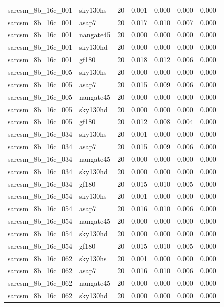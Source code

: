 \begin{tabular}{llrrrrr}
sarcsm\_8b\_16c\_001 & sky130hs & 20 & 0.001 & 0.000 & 0.000 & 0.000 \\
sarcsm\_8b\_16c\_001 & asap7 & 20 & 0.017 & 0.010 & 0.007 & 0.000 \\
sarcsm\_8b\_16c\_001 & nangate45 & 20 & 0.000 & 0.000 & 0.000 & 0.000 \\
sarcsm\_8b\_16c\_001 & sky130hd & 20 & 0.000 & 0.000 & 0.000 & 0.000 \\
sarcsm\_8b\_16c\_001 & gf180 & 20 & 0.018 & 0.012 & 0.006 & 0.000 \\
sarcsm\_8b\_16c\_005 & sky130hs & 20 & 0.000 & 0.000 & 0.000 & 0.000 \\
sarcsm\_8b\_16c\_005 & asap7 & 20 & 0.015 & 0.009 & 0.006 & 0.000 \\
sarcsm\_8b\_16c\_005 & nangate45 & 20 & 0.000 & 0.000 & 0.000 & 0.000 \\
sarcsm\_8b\_16c\_005 & sky130hd & 20 & 0.000 & 0.000 & 0.000 & 0.000 \\
sarcsm\_8b\_16c\_005 & gf180 & 20 & 0.012 & 0.008 & 0.004 & 0.000 \\
sarcsm\_8b\_16c\_034 & sky130hs & 20 & 0.001 & 0.000 & 0.000 & 0.000 \\
sarcsm\_8b\_16c\_034 & asap7 & 20 & 0.015 & 0.009 & 0.006 & 0.000 \\
sarcsm\_8b\_16c\_034 & nangate45 & 20 & 0.000 & 0.000 & 0.000 & 0.000 \\
sarcsm\_8b\_16c\_034 & sky130hd & 20 & 0.000 & 0.000 & 0.000 & 0.000 \\
sarcsm\_8b\_16c\_034 & gf180 & 20 & 0.015 & 0.010 & 0.005 & 0.000 \\
sarcsm\_8b\_16c\_054 & sky130hs & 20 & 0.001 & 0.000 & 0.000 & 0.000 \\
sarcsm\_8b\_16c\_054 & asap7 & 20 & 0.016 & 0.010 & 0.006 & 0.000 \\
sarcsm\_8b\_16c\_054 & nangate45 & 20 & 0.000 & 0.000 & 0.000 & 0.000 \\
sarcsm\_8b\_16c\_054 & sky130hd & 20 & 0.000 & 0.000 & 0.000 & 0.000 \\
sarcsm\_8b\_16c\_054 & gf180 & 20 & 0.015 & 0.010 & 0.005 & 0.000 \\
sarcsm\_8b\_16c\_062 & sky130hs & 20 & 0.001 & 0.000 & 0.000 & 0.000 \\
sarcsm\_8b\_16c\_062 & asap7 & 20 & 0.016 & 0.010 & 0.006 & 0.000 \\
sarcsm\_8b\_16c\_062 & nangate45 & 20 & 0.000 & 0.000 & 0.000 & 0.000 \\
sarcsm\_8b\_16c\_062 & sky130hd & 20 & 0.000 & 0.000 & 0.000 & 0.000 \\

\end{tabular}
